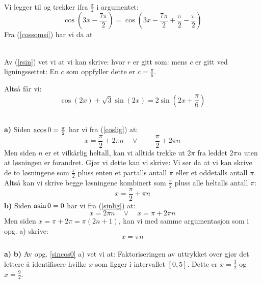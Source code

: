  \\
Vi legger til og trekker ifra $ \frac{\pi}{2} $ i argumentet:
\[ \cos\left(3x-\frac{7\pi}{2}\right) = \cos\left(3x-\frac{7\pi}{2}+\frac{\pi}{2}-\frac{\pi}{2}\right) \]
Fra (\ref{cossomsi}) har vi da at

\\
Av (\ref{rsin}) vet vi at vi kan skrive:
hvor $ r $ er gitt som:
mens $ c $ er gitt ved ligningssettet: 
En $ c $ som oppfyller dette er $ c = \frac{\pi}{6} $.

Altså får vi:
\[ \cos( 2x) + \sqrt 3\sin (2x) =2 \sin\left(2x+\frac{\pi}{6}\right) \]

\\
\textbf{a)} Siden $ \operatorname{acos} 0 = \frac{\pi}{2} $ har vi fra (\ref{coslig}) at:
\[ x = \frac{\pi}{2}+2\pi n\quad \vee \quad -\frac{\pi}{2}+2\pi n \]
Men siden $ n $ er et vilkårlig heltall, kan vi alltids trekke ut $ 2\pi $ fra leddet $ 2\pi n $ uten at løsningen er forandret. Gjør vi dette kan vi skrive:
Vi ser da at vi kan skrive de to løsningene som $ \frac{\pi}{2} $ pluss enten et partalls antall $ \pi $ eller et oddetalls antall $ \pi $. Altså  kan vi skrive begge løsningene kombinert som $ \frac{\pi}{2} $ pluss alle heltalls antall $ \pi $:
\[ x = \frac{\pi}{2}+\pi n \]
\textbf{b)} Siden $ \operatorname{asin} 0 = 0 $ har vi fra (\ref{sinlig}) at:
\[ x = 2\pi n \quad\vee\quad x=\pi +2\pi n \]
Men siden $ x=\pi + 2\pi=\pi(2n+1) $, kan vi med samme argumentasjon som i opg. a) skrive:
\[ x = \pi n \]
\\
\textbf{a)} 
\textbf{b)} Av opg. \ref{sincos0} a) vet vi at:
Faktoriseringen av uttrykket over gjør det lettere å identifisere hvilke $ x $ som ligger i intervallet $ [0, 5] $. Dette er $ x=\frac{3}{2} $ og $ x = \frac{9}{2} $. \vsk

